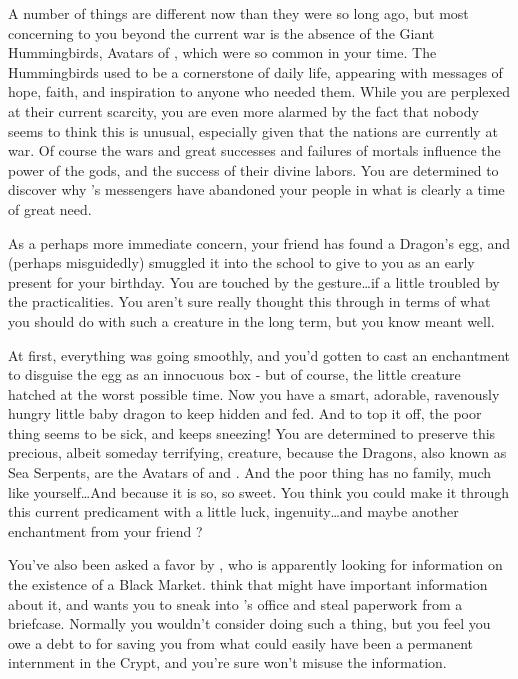 \documentclass[char]{GL2020}
\begin{document}
A number of things are different now than they were so long ago, but most concerning to you beyond the current war is the absence of the Giant Hummingbirds, Avatars of \cFarmGod{}, which were so common in your time. The Hummingbirds used to be a cornerstone of daily life, appearing with messages of hope, faith, and inspiration to anyone who needed them. While you are perplexed at their current scarcity, you are even more alarmed by the fact that nobody seems to think this is unusual, especially given that the nations are currently at war. Of course the wars and great successes and failures of mortals influence the power of the gods, and the success of their divine labors. You are determined to discover why \cFarmGod{}’s messengers have abandoned your people in what is clearly a time of great need.

As a perhaps more immediate concern, your friend \cPirateChild{} has found a Dragon’s egg, and (perhaps misguidedly) smuggled it into the school to give to you as an early present for your birthday. You are touched by the gesture\ldots if a little troubled by the practicalities. You aren’t sure \cPirateChild{} really thought this through in terms of what you should do with such a creature in the long term, but you know \cPirateChild{\they} meant well. 

At first, everything was going smoothly, and you’d gotten \cAdopted{} to cast an enchantment to disguise the egg as an innocuous box - but of course, the little creature hatched at the worst possible time. Now you have a smart, adorable, ravenously hungry little baby dragon to keep hidden and fed. And to top it off, the poor thing seems to be sick, and keeps sneezing! You are determined to preserve this precious, albeit someday terrifying, creature, because the Dragons, also known as Sea Serpents, are the Avatars of \cEbbFull{} and \cFlowFull{}. And the poor thing has no family, much like yourself\ldots And because it is so, so sweet. You think you could make it through this current predicament with a little luck, ingenuity\ldots and maybe another enchantment from your friend \cAdopted{}?

You’ve also been asked a favor by \cWildCard{}, who is apparently looking for information on the existence of a Black Market. \cWildCard{\they} think\cWildCard{\plural} that \cBunker{} might have important information about it, and \cWildCard{\they} wants you to sneak into \cBunker{}’s office and steal paperwork from a briefcase. Normally you wouldn’t consider doing such a thing, but you feel you owe a debt to \cWildCard{} for saving you from what could easily have been a permanent internment in the Crypt, and you’re sure \cWildCard{\they} won’t misuse the information.
\end{document}
